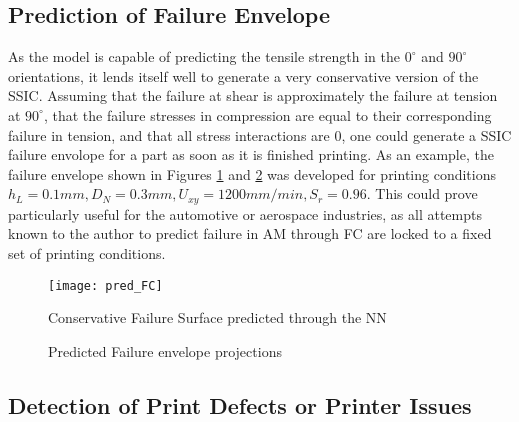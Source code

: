 \documentclass[main.tex]{subfiles}
\begin{document}
\subsection{Prediction of Failure Envelope}
As the model is capable of predicting the tensile strength in the $0^{\circ}$ and $90^{\circ}$ orientations, it lends itself well to generate a very conservative version of the SSIC. Assuming that the failure at shear is approximately the failure at tension at $90^{\circ}$, that the failure stresses in compression are equal to their corresponding failure in tension, and that all stress interactions are $0$, one could generate a SSIC failure envolope for a part as soon as it is finished printing. As an example, the failure envelope shown in Figures \ref{fig:fc_nn} and \ref{fig:SSIpred} was developed for printing conditions $h_{L}= 0.1 mm, D_{N}= 0.3 mm, U_{xy} = 1200 mm/min, S_r = 0.96$. This could prove particularly useful for the automotive or aerospace industries, as all attempts known to the author to predict failure in AM through FC are locked to a fixed set of printing conditions. 

\begin{figure}[!htbp]
	\center
	\texttt{[image: pred\_FC]}
	\caption{Conservative Failure Surface predicted through the NN} \label{fig:fc_nn}
\end{figure}

\begin{figure}[!htbp]
	\center
	\linebreak
	\linebreak
	\caption{Predicted Failure envelope projections} \label{fig:SSIpred}
\end{figure}

\subsection{Detection of Print Defects or Printer Issues}
\end{document}

